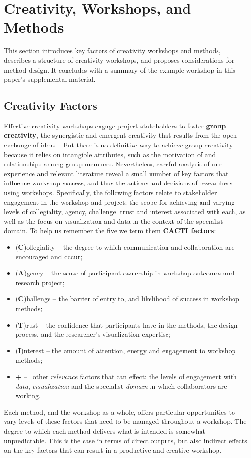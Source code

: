 \section{Creativity, Workshops, and Methods}
\label{sec:overview}

This section introduces key factors of creativity workshops and methods, describes a structure of creativity workshops, and proposes considerations for method design. It concludes with a summary of the example workshop in this paper's supplemental material.

\subsection{Creativity Factors}

Effective creativity workshops engage project stakeholders to foster {\bf group creativity}, the synergistic and emergent creativity that results from the open exchange of ideas~\cite{Sawyer2003}. But there is no definitive way to achieve group creativity because it relies on intangible attributes, such as the motivation of and relationships among group members. Nevertheless, careful analysis of our experience and relevant literature reveal a small number of key factors that influence workshop success, and thus the actions and decisions of researchers using workshops. Specifically, the following factors relate to stakeholder engagement in the workshop and project: the scope for achieving and varying levels of collegiality, agency, challenge, trust and interest associated with each, as well as the focus on visualization and data in the context of the specialist domain. To help us remember the five we term them {\bf CACTI factors}: 
\begin{itemize}[noitemsep,nolistsep]
\item(\textbf{C})ollegiality -- the degree to which communication and collaboration are encouraged and occur;
\item(\textbf{A})gency -- the sense of participant ownership in workshop outcomes and research project;
\item(\textbf{C})hallenge -- the barrier of entry to, and likelihood of success in workshop methods; 
\item(\textbf{T})rust --  the confidence that participants have in the methods, the design process, and the researcher's visualization expertise; 
\item(\textbf{I})nterest -- the amount of attention, energy and engagement to workshop methods;
\item\textbf{+} -- ~other \emph{relevance} factors that can effect: the levels of engagement with \emph{data}, \emph{visualization} and the specialist \emph{domain} in which collaborators are working.
\end{itemize}
Each method, and the workshop as a whole, offers particular opportunities to vary levels of these factors that need to be managed throughout a workshop. The degree to which each method delivers what is intended is somewhat unpredictable. This is the case in terms of direct outputs, but also indirect effects on the key factors that can result in a productive and creative workshop.

